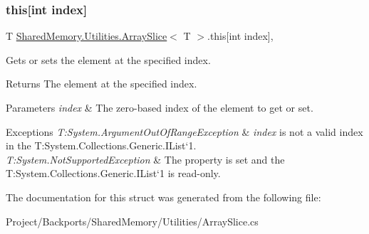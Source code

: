 \subsubsection{\texorpdfstring{this[int index]}{this[int index]}}
{\footnotesize\ttfamily T \hyperlink{struct_shared_memory_1_1_utilities_1_1_array_slice}{Shared\+Memory.\+Utilities.\+Array\+Slice}$<$ T $>$.this\mbox{[}int index\mbox{]}\hspace{0.3cm}{\ttfamily [get]}, {\ttfamily [set]}}



Gets or sets the element at the specified index.

\begin{DoxyReturn}{Returns}
The element at the specified index.
\end{DoxyReturn}

\begin{DoxyParams}{Parameters}
{\em index} & The zero-\/based index of the element to get or set.\\
\hline
\end{DoxyParams}

\begin{DoxyExceptions}{Exceptions}
{\em T\+:\+System.\+Argument\+Out\+Of\+Range\+Exception} & {\itshape index}  is not a valid index in the T\+:\+System.\+Collections.\+Generic.\+I\+List`1.\\
\hline
{\em T\+:\+System.\+Not\+Supported\+Exception} & The property is set and the T\+:\+System.\+Collections.\+Generic.\+I\+List`1 is read-\/only.\\
\hline
\end{DoxyExceptions}


The documentation for this struct was generated from the following file\+:\begin{DoxyCompactItemize}
\item 
Project/\+Backports/\+Shared\+Memory/\+Utilities/Array\+Slice.\+cs\end{DoxyCompactItemize}
